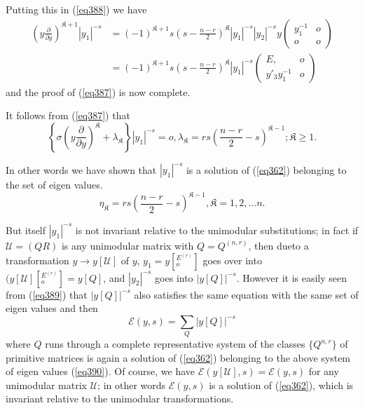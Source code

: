 Putting this in (\ref{eq388}) we have 
\begin{align*}
(y \frac{\partial}{\partial y})^{\mathfrak{K} + 1} | y_1 |^{-s} & =
  (-1)^{\mathfrak{K}+1} s (s - \frac{n - r}{2})^\mathfrak{K} | y _1
  |^{-s} |y_2 |^{-s} y \begin{pmatrix} y^{-1}_{1} & o \\ o &
    o \end{pmatrix}\\ 
& = (-1)^{\mathfrak{K} + 1} s (s - \frac{n - r}{2})^\mathfrak{K} | y
  _1|^{-s} \begin{pmatrix} E, & o \\ y'_3 y_1^{-1} & o \end{pmatrix} 
\end{align*}
and the proof of (\ref{eq387}) is now complete.

It follows from (\ref{eq387}) that
\begin{equation*}
\left \{  \sigma (y \frac{\partial}{\partial y})^\mathfrak{K} +
\lambda_\mathfrak{K} \right\} |y_1|^{-s } = o, \lambda_\mathfrak{K} = r
s (\frac{n -r}{2} - s)^{\mathfrak{K} - 1} ; \mathfrak{K} \ge
1. \tag{389}\label{eq389} 
\end{equation*}

In other words we have shown that $| y_1 |^{-s}$ is a solution of
(\ref{eq362}) belonging to the set of eigen values. 
\begin{equation*}
\eta_\mathfrak{K} = r s (\frac{n -r}{2} - s )^{\mathfrak{K} -1},
\mathfrak{K} = 1, 2, \ldots n. \tag{390}\label{eq390} 
\end{equation*}

But itself $| y_1 |^{-s}$ is not invariant relative to the unimodular
substitutions; in fact if $\mathcal{U} = (Q R)$ is any unimodular
matrix with $Q = Q^{(n, r)}$, then  due\pageoriginale to a
transformation $y \to y 
[\mathcal{U}]$ of $y$, $y_1 = y \left [ ^{E^(r)}_o\right]$ goes over
into $(y [\mathcal{U}] \left[^{E^(r)}_o\right] = y [Q]$, and $|y_2
|^{-s}$ goes into $| y [Q]|^{-s}$. However it is easily seen from
(\ref{eq389}) that $| y [Q] |^{-s}$ also satisfies the same equation with
the same set of eigen values and then  
\begin{equation*}
\mathscr{E}(y, s)  = \sum_Q | y [Q] |^{-s} \tag{391}\label{eq391}
\end{equation*}
where $Q$ runs through a complete representative system of the classes
$\{Q^{n, r}\}$ of primitive matrices is again a solution of (\ref{eq362})
belonging to the above system of eigen values (\ref{eq390}). Of course, we
have $\mathscr{E} (y [\mathcal{U}], s ) = \mathscr{E}(y, s)$ for any
unimodular matrix $\mathcal{U}$; in other words $\mathscr{E} (y, s)$
is a solution of (\ref{eq362}), which is invariant relative to the
unimodular transformations. 

